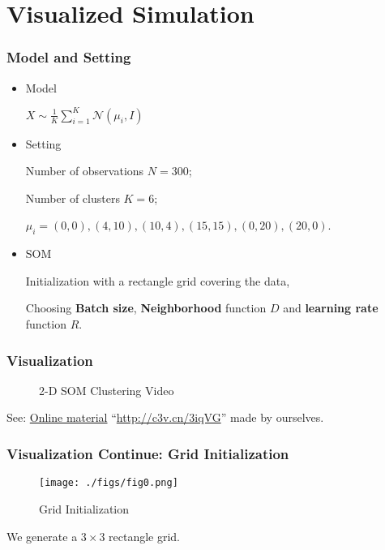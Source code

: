 \section{Visualized Simulation}
\begin{frame}
\sectionpage
\end{frame}

\begin{frame}
    \frametitle{Model and Setting}
    \begin{itemize}
        \item Model
        
        \hspace{2em} $X \sim \frac{1}{K} \sum_{i=1}^K \mathcal{N}(\mu_i, I)$

        \item Setting

        \hspace{2em} Number of observations $N= 300$;

        \hspace{2em} Number of clusters $K = 6$;

        \hspace{2em} $\mu_i = (0,0), (4,10), (10,4), (15,15), (0,20), (20, 0)$.

        \item SOM
        
        \hspace{2em} Initialization with a rectangle grid covering the data, 

        \hspace{2em} Choosing \textbf{Batch size}, \textbf{Neighborhood} function $D$ and \textbf{learning rate} function $R$.
    \end{itemize}
\end{frame}

\begin{frame}
    \frametitle{Visualization}
    \vspace{-3em}
    \begin{figure}[!htp]
        \centering
        \caption{2-D SOM Clustering Video}
    \end{figure}
    See: \href{http://home.ustc.edu.cn/~huihang/som_b.gif}{Online material} ``\url{http://c3v.cn/3iqVG}'' made by ourselves. 
\end{frame}

\begin{frame}
    \frametitle{Visualization Continue: Grid Initialization}
    \begin{figure}[!hp]
        \centering
        \texttt{[image: ./figs/fig0.png]}
        \caption{Grid Initialization}
        \label{fig:grid}
    \end{figure}
    We generate a $3\times 3$ rectangle grid.
\end{frame}

